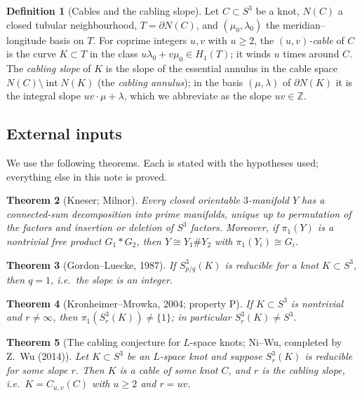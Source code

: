 \documentclass[11pt]{article}
\newtheorem{theorem}{Theorem}[section]
\theoremstyle{definition}
\newtheorem{definition}[theorem]{Definition}
\theoremstyle{remark}
\newcommand{\Z}{\mathbb{Z}}
\begin{document}
\begin{definition}[Cables and the cabling slope]\label{def:cable}
Let $C\subset S^3$ be a knot, $N(C)$ a closed tubular neighbourhood,
$T=\partial N(C)$, and $(\mu_0,\lambda_0)$ the meridian--longitude basis on
$T$.  For coprime integers $u,v$ with $u\ge 2$, the \emph{$(u,v)$-cable} of
$C$ is the curve $K\subset T$ in the class $u\lambda_0+v\mu_0\in H_1(T)$; it
winds $u$ times around $C$.  The \emph{cabling slope} of $K$ is the slope of
the essential annulus in the cable space $N(C)\setminus\operatorname{int}N(K)$
(the \emph{cabling annulus}); in the basis $(\mu,\lambda)$ of $\partial N(K)$
it is the integral slope $uv\cdot\mu+\lambda$, which we abbreviate as the
slope $uv\in\Z$.
\end{definition}

\subsection{External inputs}

We use the following theorems.  Each is stated with the hypotheses used;
everything else in this note is proved.

\begin{theorem}[Kneser; Milnor]\label{thm:knmilnor}
Every closed orientable $3$-manifold $Y$ has a connected-sum decomposition
into prime manifolds, unique up to permutation of the factors and insertion or
deletion of $S^3$ factors.  Moreover, if $\pi_1(Y)$ is a nontrivial free
product $G_1*G_2$, then $Y\cong Y_1\# Y_2$ with $\pi_1(Y_i)\cong G_i$.
\end{theorem}

\begin{theorem}[Gordon--Luecke, 1987]\label{thm:gl}
If $S^3_{p/q}(K)$ is reducible for a knot $K\subset S^3$, then $q=1$, i.e.\
the slope is an integer.
\end{theorem}

\begin{theorem}[Kronheimer--Mrowka, 2004; property P]\label{thm:propP}
If $K\subset S^3$ is nontrivial and $r\ne\infty$, then
$\pi_1(S^3_r(K))\ne \{1\}$; in particular $S^3_r(K)\ne S^3$.
\end{theorem}

\begin{theorem}[The cabling conjecture for $L$-space knots; Ni--Wu, completed
by Z.~Wu (2014)]\label{thm:niwu}
Let $K\subset S^3$ be an $L$-space knot and suppose $S^3_r(K)$ is reducible
for some slope $r$.  Then $K$ is a cable of some knot $C$, and $r$ is the
cabling slope, i.e.\ $K=C_{u,v}(C)$ with $u\ge 2$ and $r=uv$.
\end{theorem}
\end{document}
